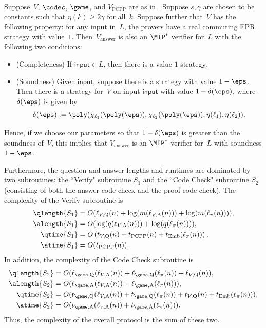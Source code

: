 \begin{theorem}\label{thm:answer-reduction}
Suppose~$V$, $\codec$, $\game$, and $V_{\mathrm{PCPP}}$ are as in .
Suppose $s, \gamma$ are chosen to be constants such that $\eta(k) \geq 2\gamma$ for all~$k$.
Suppose further that~$V$ has the following property: for any input in~$L$,
the provers have a real commuting EPR strategy with value~$1$.
Then~$V_{\mathrm{answer}}$ is also an $\MIP^*$ verifier for~$L$ with the following two conditions:
\begin{itemize}
\item[$\circ$] (Completeness) If $\mathsf{input} \in L$, then there is a value-$1$ strategy.
\item[$\circ$] (Soundness) Given $\mathsf{input}$, suppose there is a strategy with value $1-\eps$.
			Then there is a strategy for~$V$ on input $\mathsf{input}$ with value $1-\delta(\eps)$, where $\delta(\eps)$ is given by
\begin{equation*}
\delta(\eps) := \poly(\chi_{\ell_1}(\poly(\eps)), \chi_{\ell_2}(\poly(\eps)), \eta(\ell_1), \eta(\ell_2)).
\end{equation*}
\end{itemize}
Hence, if we choose our parameters so that $1-\delta(\eps)$ is greater than the soundness of~$V$,
this implies that $V_{\mathrm{answer}}$ is an $\MIP^*$ verifier for~$L$ with soundness $1-\eps$.

Furthermore, the question and answer lengths and runtimes are dominated by two subroutines: the ``Verify" subroutine $S_1$ 
and the ``Code Check" subroutine $S_2$ (consisting of both the answer code check and the proof code check).
The complexity of the Verify subroutine is
\begin{align*}
\qlength{S_1} &= O(\ell_{V, \mathrm{Q}}(n) + \log(m(\ell_{V,\mathrm{A}}(n)))+ \log(m(\ell_{\pi}(n)))),\\
\alength{S_1} &= O(\log(q(\ell_{V,\mathrm{A}}(n))) + \log(q(\ell_\pi(n)))),\\
\qtime{S_1} &= O\left(t_{V,\mathrm{Q}}(n) + t_{\mathrm{PCPP}}(n) + t_{\mathrm{Emb}}(\ell_{\pi}(n))\right),\\
\atime{S_1} &= O(t_{\mathrm{PCPP}}(n)).
\end{align*}
In addition, the complexity of the Code Check subroutine is
\begin{align*}
\qlength{S_2} &= O(\ell_{\game, \mathrm{Q}}(\ell_{V, \mathrm{A}}(n)) + \ell_{\game, \mathrm{Q}}(\ell_\pi(n)) + \ell_{V, \mathrm{Q}}(n)),\\
\alength{S_2} &= O(\ell_{\game, \mathrm{A}}(\ell_{V, \mathrm{A}}(n)) + \ell_{\game, \mathrm{A}}(\ell_\pi(n))),\\
\qtime{S_2} &=  O(t_{\game, \mathrm{Q}}(\ell_{V, \mathrm{A}}(n)) + t_{\game, \mathrm{Q}}(\ell_\pi(n)) + t_{V, \mathrm{Q}}(n) + t_{\mathrm{Emb}}(\ell_{\pi}(n))),\\
\atime{S_2} &= O(t_{\game, \mathrm{A}}(\ell_{V, \mathrm{A}}(n)) + t_{\game, \mathrm{A}}(\ell_\pi(n))).
\end{align*}
Thus, the complexity of the overall protocol is the sum of these two.
\end{theorem}
